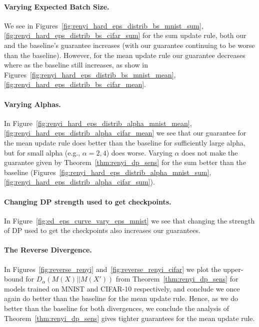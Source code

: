 \paragraph{Varying Expected Batch Size.} We see in Figures~\ref{fig:renyi_hard_eps_distrib_bs_mnist_sum},\ref{fig:renyi_hard_eps_distrib_bs_cifar_sum} for the sum update rule, both our and the baseline's guarantee increases (with our guarantee continuing to be worse than the baseline). However, for the mean update rule our guarantee decreases where as the baseline still increases, as show in Figures~\ref{fig:renyi_hard_eps_distrib_bs_mnist_mean},\ref{fig:renyi_hard_eps_distrib_bs_cifar_mean}. 

\paragraph{Varying Alphas.} In Figure~\ref{fig:renyi_hard_eps_distrib_alpha_mnist_mean},\ref{fig:renyi_hard_eps_distrib_alpha_cifar_mean} we see that our guarantee for the mean update rule does better than the baseline for sufficiently large alpha, but for small alpha (e.g., $\alpha = 2,4$) does worse. Varying $\alpha$ does not make the guarantee given by Theorem~\ref{thm:renyi_dp_sens} for the sum better than the baseline (Figures~\ref{fig:renyi_hard_eps_distrib_alpha_mnist_sum},\ref{fig:renyi_hard_eps_distrib_alpha_cifar_sum}).






\paragraph{Changing DP strength used to get checkpoints.} In Figure~\ref{fig:ed_eps_curve_vary_eps_mnist} we see that changing the strength of DP used to get the checkpoints also increases our guarantees.

\paragraph{The Reverse Divergence.}
In Figures~\ref{fig:reverse_renyi} and~\ref{fig:reverse_renyi_cifar} we plot the upper-bound for $D_{\alpha}(M(X)||M(X'))$ from Theorem~\ref{thm:renyi_dp_sens} for models trained on MNIST and CIFAR-10 respectively, and conclude we once again do better than the baseline for the mean update rule. Hence, as we do better than the baseline for both divergences, we conclude the analysis of Theorem~\ref{thm:renyi_dp_sens} gives tighter guarantees for the mean update rule.




